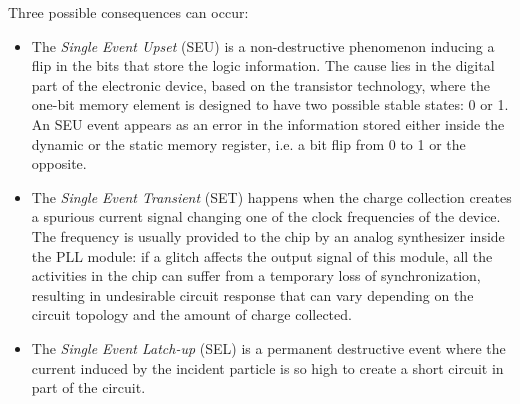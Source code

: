 

Three possible consequences can occur:
\begin{itemize}
    \item The \textit{Single Event Upset} (SEU) is a non-destructive phenomenon inducing a flip in the bits that store the logic information. The cause lies in the digital part of the electronic device, based on the transistor technology, where the one-bit memory element is designed to have two possible stable states: 0 or 1. An SEU event appears as an error in the information stored either inside the dynamic or the static memory register, i.e. a bit flip from 0 to 1 or the opposite.
    \item The \textit{Single Event Transient} (SET) happens when the charge collection creates a spurious current signal changing one of the clock frequencies of the device. The frequency is usually provided to the chip by an analog synthesizer inside the PLL module: if a glitch affects the output signal of this module, all the activities in the chip can suffer from a temporary loss of synchronization, resulting in undesirable circuit response that can vary depending on the circuit topology and the amount of charge collected.
    \item The \textit{Single Event Latch-up} (SEL) is a permanent destructive event where the current induced by the incident particle is so high to create a short circuit in part of the circuit.
\end{itemize}

